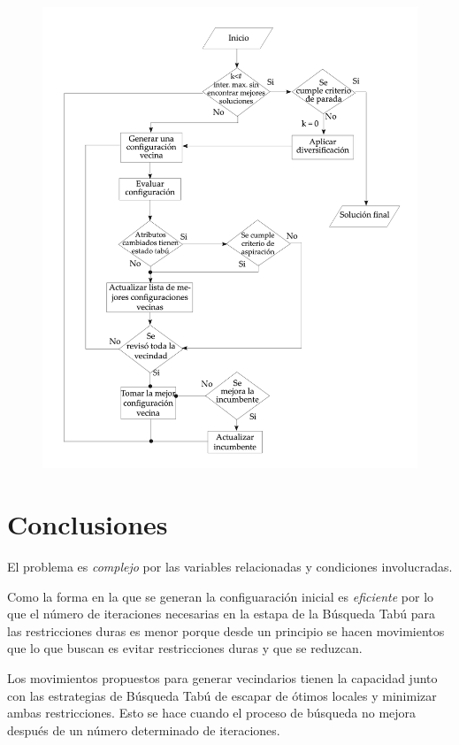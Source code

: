 \documentclass[12pt,letterpaper]{article}
\begin{document}
\begin{figure}[H]
	\centering
		\includegraphics[scale=0.45]{assets/tabu.png}
\end{figure}
\section{Conclusiones}
El problema es \textit{complejo} por las variables relacionadas y condiciones involucradas.

Como la forma en la que se generan la configuaración inicial es \textit{eficiente} por lo que el número
de iteraciones necesarias en la estapa de la Búsqueda Tabú para las restricciones duras es menor porque desde
un principio se hacen movimientos que lo que buscan es evitar restricciones duras y que se reduzcan.

Los movimientos propuestos para generar vecindarios tienen la capacidad junto con las estrategias de
Búsqueda Tabú de escapar de ótimos locales y minimizar ambas restricciones. Esto se hace cuando el
proceso de búsqueda no mejora después de un número determinado de iteraciones.
\end{document}
